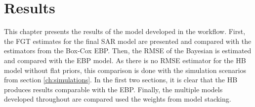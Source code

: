 \chapter{Results}

This chapter presents the results of the model developed in the workflow.
First, the FGT estimates for the final SAR model are presented and compared with the estimators from the Box-Cox EBP.
Then, the RMSE of the Bayesian is estimated and compared with the EBP model.
As there is no RMSE estimator for the HB model without flat priors, this comparison is done with the simulation scenarios from section \ref{ch:simulations}.
In the first two sections, it is clear that the HB produces results comparable with the EBP.
Finally, the multiple models developed throughout are compared used the weights from model stacking.









